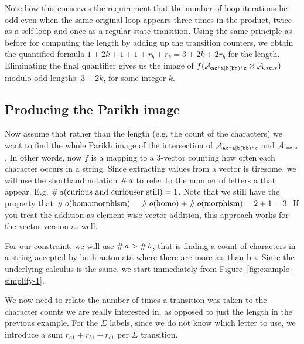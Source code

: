 \documentclass[acmsmall,review,anonymous,screen]{acmart}\settopmatter{printfolios=true,printccs=false,printacmref=true}
\theoremstyle{definition}
\begin{document}
Note how this conserves the requirement that the number of loop iterations be
odd even when the same original loop appears three times in the product, twice
as a self-loop and once as a regular state transition. Using the same principle
as before for computing the length by adding up the transition counters, we
obtain the quantified formula $1 + 2k + 1 + 1 + r_b + r_b= 3 + 2k + 2r_b$ for
the length. Eliminating the final quantifier gives us the image of $f(\mathcal{A}_{\mathtt{ac^*a|b(bb)^*c}}
\times \mathcal{A}_{\mathtt{.*c.*}})$ modulo odd lengths: $3 + 2k$, for some integer
$k$.

\subsection{Producing the Parikh image}\label{sec:introduction:parikh}

Now assume that rather than the length (e.g. the count of the characters) we
want to find the whole Parikh image of the intersection of $\mathcal{A}_{\mathtt{ac^*a|b(bb)^*c}}{}$ and
$\mathcal{A}_{\mathtt{.*c.*}}{}$. In other words, now $f$ is a mapping to a 3-vector
counting how often each character occurs in a string. Since extracting values
from a vector is tiresome, we will use the shorthand notation
$\operatorname{\#}{a}$ to refer to the number of letters a that appear. E.g.
$\operatorname{\#}{a}(\text{curious and curiouser still}) = 1$. Note that we
still have the property that $\operatorname{\#}{o}(\text{homomorphism}) =
\operatorname{\#}{o}(\text{homo}) + \operatorname{\#}{o}(\text{morphism}) = 2 + 1
= 3$. If you treat the addition as element-wise vector addition, this approach
works for the vector version as well.

For our constraint, we will use $\operatorname{\#}{a} > \operatorname{\#}{b}$,
that is finding a count of characters in a string accepted by both automata where
there are more a:s than b:s. Since the underlying calculus is the same, we start immediately from Figure~\ref{fig:example-simplify-1}.

  We now need to relate the number of times a transition was taken to the
  character counts we are really interested in, as opposed to just the length in
  the previous example. For the $\Sigma$ labels, since we do not know which
  letter to use, we introduce a sum $r_{a1} + r_{b1} + r_{c1}$ per $\Sigma$
  transition.
\end{document}
